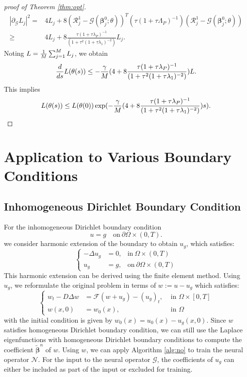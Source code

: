 \documentclass[preprint,12pt]{elsarticle}
\theoremstyle{plain}
\numberwithin{figure}{section}
\numberwithin{table}{section}
\begin{document}
\begin{proof}[proof of Theorem \ref{thm:opt}]
\begin{equation}
\begin{aligned}
			|\partial_{\mathcal{G}}{L}_j|^2 =& 4L_j + 8 (\mathcal{R}^1_j-\mathcal{G}(\bm{\beta}_j^0;\theta))^T(\tau(1+\tau\Lambda_P)^{-1})(\mathcal{R}^1_j-\mathcal{G}(\bm{\beta}_j^0;\theta))\\
			\ge & 4L_j + 8 \frac{\tau(1+\tau\lambda_P)^{-1}}{(1+\tau^2(1+\tau\lambda_1)^{-2})} L_j.
		\end{aligned}
	\end{equation}
	Noting $L={1\over M}\sum_{j=1}^M L_j$, we obtain
	\begin{equation}
		{d\over ds}L(\theta(s)) \le -{\gamma\over M} (4+8 \frac{\tau(1+\tau\lambda_P)^{-1}}{(1+\tau^2(1+\tau\lambda_1)^{-2})}) L.
	\end{equation}
	This implies 
	\begin{equation}
		L(\theta(s)) \le L(\theta(0))\exp(-{\gamma\over M}(4+8 \frac{\tau(1+\tau\lambda_P)^{-1}}{(1+\tau^2(1+\tau\lambda_1)^{-2})})s).
	\end{equation}
\end{proof}


\section{Application to Various Boundary Conditions}\label{appendix:boundary}
\subsection{Inhomogeneous Dirichlet Boundary Condition}
For the inhomogeneous Dirichlet boundary condition 
\begin{equation}
	u=g \quad \text{on}~\partial\Omega\times(0,T).
\end{equation}
we consider harmonic extension of the boundary to obtain $u_g$,  which satisfies:
\begin{equation}
	\left\{
	\begin{aligned}
		-\Delta u_g &= 0, &\text{in}~\Omega \times (0,T)\\
		u_g &=g,&\text{on}~\partial\Omega\times(0,T)
	\end{aligned}
	\right.
\end{equation}
This harmonic extension can be derived using the finite element method. Using $u_g$, we reformulate the original problem in terms of $w:=u-u_g$ which satisfies:
\begin{equation}
	\left\{
	\begin{aligned}
		w_t-D\Delta w &= \mathcal{F}(w+u_g)-(u_g)_t, & \text{ in }\Omega\times [0,T]\\
		w(x,0) &= w_0(x), &\text{ in }\Omega
	\end{aligned}\right.
\end{equation}
with the initial condition is given by $w_0(x)=u_0(x)-u_g(x,0)$. Since $w$ satisfies homogeneous Dirichlet boundary condition, we can still use the Laplace eigenfunctions with homogeneous Dirichlet boundary conditions to compute the coefficient $\bm{\widetilde{\beta}}^n$ of $w$. Using $w$, we can apply Algorithm \ref{alg:no} to train the neural operator $\mathcal{N}$. For the input to the neural operator $\mathcal{G}$, the coefficients of $u_g$ can either be included as part of the input or excluded for training.
\end{document}
